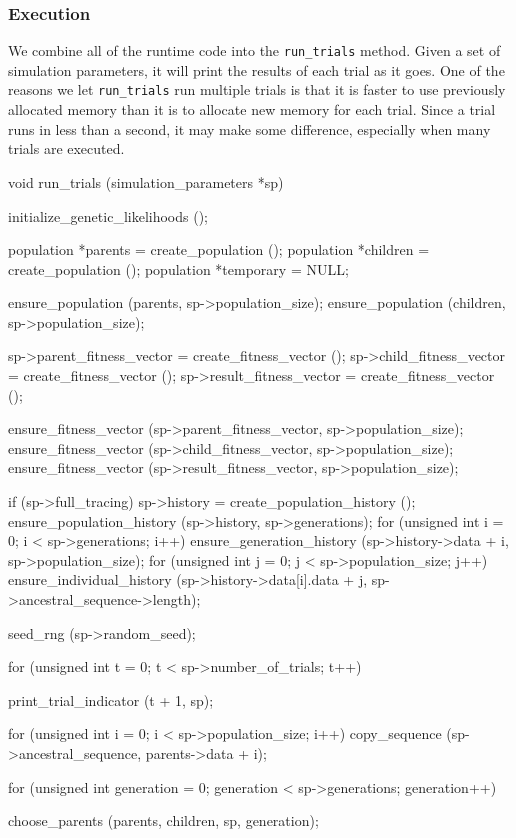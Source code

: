 \documentclass{article}
\begin{document}
      \subsubsection{Execution}

	We combine all of the runtime code into the \verb|run_trials| method.
	Given a set of simulation parameters, it will print the results of each
	trial as it goes. One of the reasons we let \verb|run_trials| run
	multiple trials is that it is faster to use previously allocated memory
	than it is to allocate new memory for each trial. Since a trial runs in
	less than a second, it may make some difference, especially when many
	trials are executed.

\begin{ccode}
void run_trials (simulation_parameters *sp) {
  initialize_genetic_likelihoods ();

  population *parents = create_population ();
  population *children = create_population ();
  population *temporary = NULL;

  ensure_population (parents, sp->population_size);
  ensure_population (children, sp->population_size);

  sp->parent_fitness_vector = create_fitness_vector ();
  sp->child_fitness_vector = create_fitness_vector ();
  sp->result_fitness_vector = create_fitness_vector ();

  ensure_fitness_vector (sp->parent_fitness_vector, sp->population_size);
  ensure_fitness_vector (sp->child_fitness_vector, sp->population_size);
  ensure_fitness_vector (sp->result_fitness_vector, sp->population_size);

  if (sp->full_tracing) {
    sp->history = create_population_history ();
    ensure_population_history (sp->history, sp->generations);
    for (unsigned int i = 0; i < sp->generations; i++) {
      ensure_generation_history (sp->history->data + i, sp->population_size);
      for (unsigned int j = 0; j < sp->population_size; j++)
       ensure_individual_history (sp->history->data[i].data + j, sp->ancestral_sequence->length);
    }
  }

  seed_rng (sp->random_seed);

  for (unsigned int t = 0; t < sp->number_of_trials; t++) {
    print_trial_indicator (t + 1, sp);

    for (unsigned int i = 0; i < sp->population_size; i++)
      copy_sequence (sp->ancestral_sequence, parents->data + i);

    for (unsigned int generation = 0; generation < sp->generations; generation++) {
      choose_parents (parents, children, sp, generation);

}}}
\end{ccode}
\end{document}

